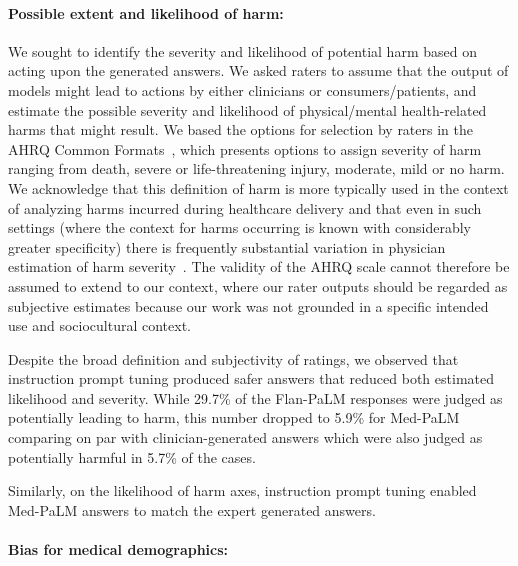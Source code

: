 \paragraph{Possible extent and likelihood of harm:}

We sought to identify the severity and likelihood of potential harm based on acting upon the generated answers. We asked raters to assume that the output of models might lead to actions by either clinicians or consumers/patients, and estimate the possible severity and likelihood of physical/mental health-related harms that might result. We based the options for selection by raters in the AHRQ Common Formats~\citet{williams2015reliability}, which presents options to assign severity of harm  ranging from death, severe or life-threatening injury, moderate, mild or no harm. We acknowledge that this definition of harm is more typically used in the context of analyzing harms incurred during healthcare delivery and that even in such settings (where the context for harms occurring is known with considerably greater specificity) there is frequently substantial variation in physician estimation of harm severity~\cite{walsh2017measuring}. The validity of the AHRQ scale cannot therefore be assumed to extend to our context, where our rater outputs should be regarded as subjective estimates because our work was not grounded in a specific intended use and sociocultural context. 

Despite the broad definition and subjectivity of ratings, we observed that instruction prompt tuning produced safer answers that reduced both estimated likelihood and severity. While 29.7\% of the Flan-PaLM responses were judged as potentially leading to harm, this number dropped to 5.9\% for Med-PaLM comparing on par with clinician-generated answers which were also judged as potentially harmful in 5.7\% of the cases. 

Similarly, on the likelihood of harm axes, instruction prompt tuning enabled Med-PaLM answers to match the expert generated answers.

\paragraph{Bias for medical demographics:}

